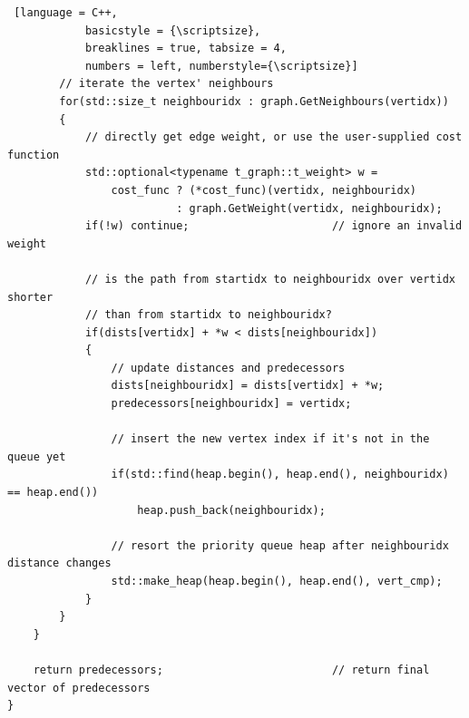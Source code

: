 \begin{listing}[htb]
\begin{lstlisting} [language = C++,
			basicstyle = {\scriptsize},
			breaklines = true, tabsize = 4,
			numbers = left, numberstyle={\scriptsize}]
		// iterate the vertex' neighbours
		for(std::size_t neighbouridx : graph.GetNeighbours(vertidx))
		{
			// directly get edge weight, or use the user-supplied cost function
			std::optional<typename t_graph::t_weight> w = 
				cost_func ? (*cost_func)(vertidx, neighbouridx)
				          : graph.GetWeight(vertidx, neighbouridx);
			if(!w) continue;                      // ignore an invalid weight

			// is the path from startidx to neighbouridx over vertidx shorter
			// than from startidx to neighbouridx?
			if(dists[vertidx] + *w < dists[neighbouridx])
			{
				// update distances and predecessors
				dists[neighbouridx] = dists[vertidx] + *w;
				predecessors[neighbouridx] = vertidx;

				// insert the new vertex index if it's not in the queue yet
				if(std::find(heap.begin(), heap.end(), neighbouridx) == heap.end())
					heap.push_back(neighbouridx);

				// resort the priority queue heap after neighbouridx distance changes
				std::make_heap(heap.begin(), heap.end(), vert_cmp);
			}
		}
	}

	return predecessors;                          // return final vector of predecessors
}
	\end{lstlisting}
	\caption[C++ implementation of Dijkstra's algorithm]{
	C++20 implementation of Dijkstra's algorithm, based on pseudo-codes from 
	Refs. \cite[p. 17]{FUH_algo_graphs_2021} and \cite[p. 285]{Erickson2019}.
	\label{lst:dijkstra}}
\end{listing}


